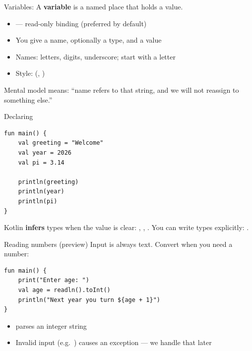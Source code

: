 \documentclass[aspectratio=169,11pt]{beamer}
\begin{document}
    \begin{frame}{Variables: }
        A \textbf{variable} is a named place that holds a value.
        \vspace{0.6em}
        \begin{itemize}
            \item {} --- read-only binding (preferred by default)
            \item You give a name, optionally a type, and a value
            \item Names: letters, digits, underscore; start with a letter
            \item Style:  (, )
        \end{itemize}
        \vspace{0.5em}
        \begin{block}{Mental model}
             means: ``name refers to that string, and
            we will not reassign  to something else.''
        \end{block}
    \end{frame}

    \begin{frame}[fragile]{Declaring }
        \begin{lstlisting}
fun main() {
    val greeting = "Welcome"
    val year = 2026
    val pi = 3.14

    println(greeting)
    println(year)
    println(pi)
}
        \end{lstlisting}
        \vspace{0.3em}
        Kotlin \textbf{infers} types when the value is clear:
        , , .
        You can write types explicitly: .
    \end{frame}

    \begin{frame}[fragile]{Reading numbers (preview)}
        Input is always text. Convert when you need a number:
        \vspace{0.3em}
        \begin{lstlisting}
fun main() {
    print("Enter age: ")
    val age = readln().toInt()
    println("Next year you turn ${age + 1}")
}
        \end{lstlisting}
        \vspace{0.3em}
        \begin{itemize}
            \item {} parses an integer string
            \item Invalid input (e.g.\ ) causes an exception --- we handle that later
        \end{itemize}
    \end{frame}
\end{document}
